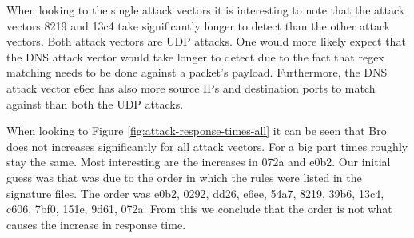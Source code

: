 When looking to the single attack vectors it is interesting to note that the attack vectors 8219 and 13c4 take significantly longer to detect than the other attack vectors. Both attack vectors are UDP attacks. One would more likely expect that the DNS attack vector would take longer to detect due to the fact that regex matching needs to be done against a packet's payload. Furthermore, the DNS attack vector e6ee has also more source IPs and destination ports to match against than both the UDP attacks. 

When looking to Figure \ref{fig:attack-response-times-all} it can be seen that Bro does not increases significantly for all attack vectors. For a big part times roughly stay the same. Most interesting are the increases in 072a and e0b2. Our initial guess was that was due to the order in which the rules were listed in the signature files. The order was e0b2, 0292, dd26, e6ee, 54a7, 8219, 39b6, 13c4, c606, 7bf0, 151e, 9d61, 072a. From this we conclude that the order is not what causes the increase in response time. 

